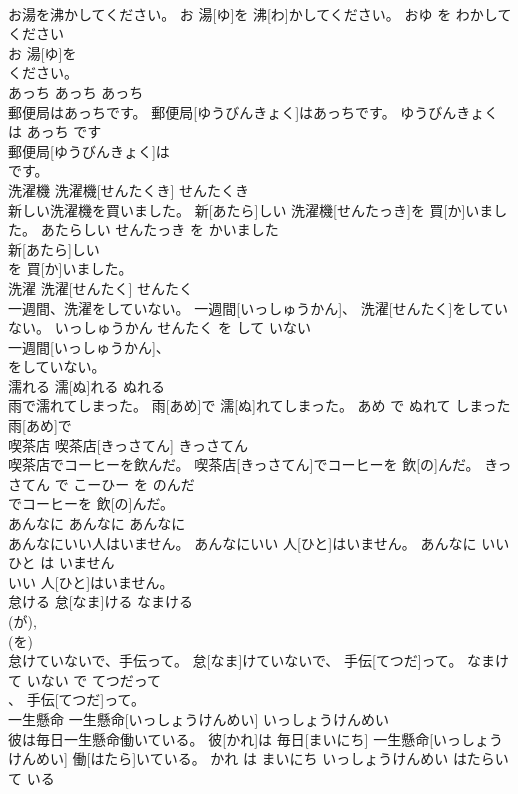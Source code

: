 \documentclass[8pt]{extreport}
\begin{document}
\begin{CJK}{UTF8}{min}
\\	お湯を沸かしてください。	お 湯[ゆ]を 沸[わ]かしてください。	おゆ を わかして ください	
\\	お 湯[ゆ]を
\\	ください。		
\\	あっち	あっち	あっち	
\\	郵便局はあっちです。	郵便局[ゆうびんきょく]はあっちです。	ゆうびんきょく は あっち です	
\\	郵便局[ゆうびんきょく]は
\\	です。		
\\	洗濯機	洗濯機[せんたくき]	せんたくき	
\\	新しい洗濯機を買いました。	新[あたら]しい 洗濯機[せんたっき]を 買[か]いました。	あたらしい せんたっき を かいました	
\\	新[あたら]しい
\\	を 買[か]いました。		
\\	洗濯	洗濯[せんたく]	せんたく	
\\	一週間、洗濯をしていない。	一週間[いっしゅうかん]、 洗濯[せんたく]をしていない。	いっしゅうかん せんたく を して いない	
\\	一週間[いっしゅうかん]、
\\	をしていない。		
\\	濡れる	濡[ぬ]れる	ぬれる	
\\	雨で濡れてしまった。	雨[あめ]で 濡[ぬ]れてしまった。	あめ で ぬれて しまった	
\\	雨[あめ]で
\\	喫茶店	喫茶店[きっさてん]	きっさてん	
\\	喫茶店でコーヒーを飲んだ。	喫茶店[きっさてん]でコーヒーを 飲[の]んだ。	きっさてん で こーひー を のんだ	
\\	でコーヒーを 飲[の]んだ。		
\\	あんなに	あんなに	あんなに	
\\	あんなにいい人はいません。	あんなにいい 人[ひと]はいません。	あんなに いい ひと は いません	
\\	いい 人[ひと]はいません。		
\\	怠ける	怠[なま]ける	なまける	
\\	(が), 
\\	(を)		
\\	怠けていないで、手伝って。	怠[なま]けていないで、 手伝[てつだ]って。	なまけて いない で てつだって	
\\	、 手伝[てつだ]って。		
\\	一生懸命	一生懸命[いっしょうけんめい]	いっしょうけんめい	
\\	彼は毎日一生懸命働いている。	彼[かれ]は 毎日[まいにち] 一生懸命[いっしょうけんめい] 働[はたら]いている。	かれ は まいにち いっしょうけんめい はたらいて いる	

\end{CJK}
\end{document}
